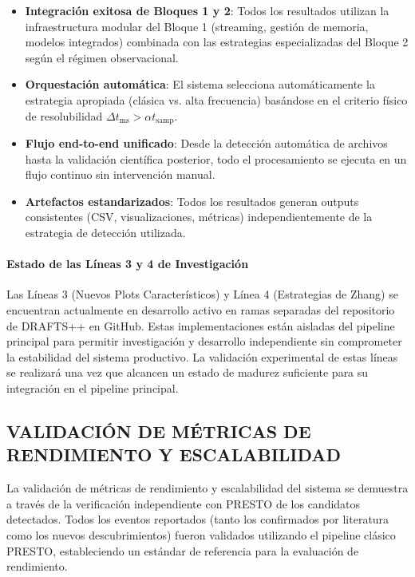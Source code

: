 \begin{itemize}
    \item \textbf{Integración exitosa de Bloques 1 y 2}: Todos los resultados utilizan la infraestructura modular del Bloque 1 (streaming, gestión de memoria, modelos integrados) combinada con las estrategias especializadas del Bloque 2 según el régimen observacional.
    \item \textbf{Orquestación automática}: El sistema selecciona automáticamente la estrategia apropiada (clásica vs. alta frecuencia) basándose en el criterio físico de resolubilidad $\Delta t_{\mathrm{ms}} > \alpha t_{\mathrm{samp}}$.
    \item \textbf{Flujo end-to-end unificado}: Desde la detección automática de archivos hasta la validación científica posterior, todo el procesamiento se ejecuta en un flujo continuo sin intervención manual.
    \item \textbf{Artefactos estandarizados}: Todos los resultados generan outputs consistentes (CSV, visualizaciones, métricas) independientemente de la estrategia de detección utilizada.
\end{itemize}

\paragraph{Estado de las Líneas 3 y 4 de Investigación}

Las Líneas 3 (Nuevos Plots Característicos) y Línea 4 (Estrategias de Zhang) se encuentran actualmente en desarrollo activo en ramas separadas del repositorio de DRAFTS++ en GitHub. Estas implementaciones están aisladas del pipeline principal para permitir investigación y desarrollo independiente sin comprometer la estabilidad del sistema productivo. La validación experimental de estas líneas se realizará una vez que alcancen un estado de madurez suficiente para su integración en el pipeline principal.

\subsection{VALIDACIÓN DE MÉTRICAS DE RENDIMIENTO Y ESCALABILIDAD}

La validación de métricas de rendimiento y escalabilidad del sistema se demuestra a través de la verificación independiente con PRESTO de los candidatos detectados. Todos los eventos reportados (tanto los confirmados por literatura como los nuevos descubrimientos) fueron validados utilizando el pipeline clásico PRESTO, estableciendo un estándar de referencia para la evaluación de rendimiento.

